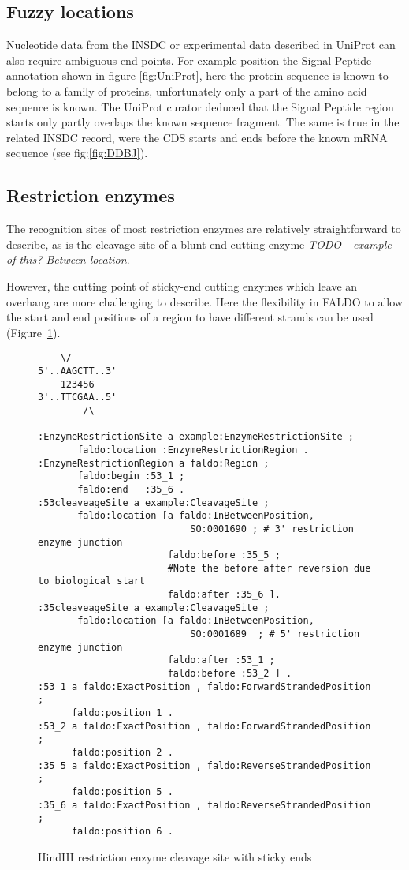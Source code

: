\subsection*{Fuzzy locations}
Nucleotide data from the INSDC or experimental data described in UniProt can also require ambiguous end points. 
For example position the Signal Peptide annotation shown in figure \ref{fig:UniProt}, 
here the protein sequence is known to belong to a family of proteins, unfortunately only a part of the amino acid sequence is known. 
The UniProt curator deduced that the Signal Peptide region starts only partly overlaps the known sequence fragment.
The same is true in the related INSDC record, were the CDS starts and ends before the known mRNA sequence (see fig:\ref{fig:DDBJ}).

\subsection*{Restriction enzymes}

The recognition sites of most restriction enzymes are relatively
straightforward to describe, as is the cleavage site of a blunt
end cutting enzyme \textit{TODO - example of this? Between location}.

However, the cutting point of sticky-end cutting enzymes which
leave an overhang are more challenging to describe. Here the
flexibility in FALDO to allow the start and end positions of a region
to have different strands can be used (Figure~\ref{fig:HindIII}).

\begin{figure}
\begin{shaded}
\small
\begin{verbatim}
    \/
5'..AAGCTT..3' 
    123456
3'..TTCGAA..5'
        /\
        
:EnzymeRestrictionSite a example:EnzymeRestrictionSite ;
       faldo:location :EnzymeRestrictionRegion .
:EnzymeRestrictionRegion a faldo:Region ;
       faldo:begin :53_1 ;
       faldo:end   :35_6 .
:53cleaveageSite a example:CleavageSite ;
       faldo:location [a faldo:InBetweenPosition, 
                           SO:0001690 ; # 3' restriction enzyme junction 
                       faldo:before :35_5 ;
                       #Note the before after reversion due to biological start      
                       faldo:after :35_6 ]. 
:35cleaveageSite a example:CleavageSite ;
       faldo:location [a faldo:InBetweenPosition, 
                           SO:0001689  ; # 5' restriction enzyme junction 
                       faldo:after :53_1 ;        
                       faldo:before :53_2 ] .
:53_1 a faldo:ExactPosition , faldo:ForwardStrandedPosition ;
      faldo:position 1 .
:53_2 a faldo:ExactPosition , faldo:ForwardStrandedPosition ;
      faldo:position 2 .
:35_5 a faldo:ExactPosition , faldo:ReverseStrandedPosition ;
      faldo:position 5 .
:35_6 a faldo:ExactPosition , faldo:ReverseStrandedPosition ;
      faldo:position 6 .
\end{verbatim}
\end{shaded}
\caption{HindIII restriction enzyme cleavage site with sticky ends}
\label{fig:HindIII}
\end{figure}


